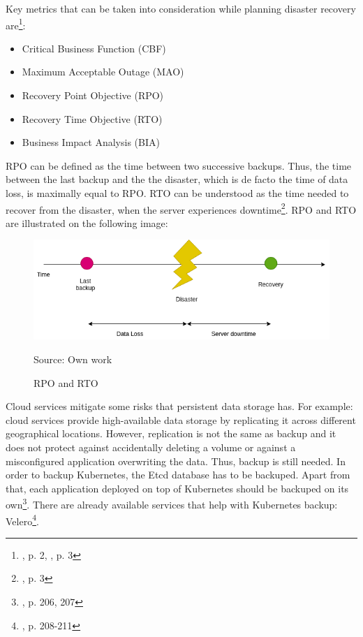 Key metrics that can be taken into consideration while planning disaster recovery are\footnote{\cite{article-dr}, p. 2, \cite{article-dr-cloud}, p. 3}:
\begin{itemize}
\item Critical Business Function (CBF)
\item Maximum Acceptable Outage (MAO)
\item Recovery Point Objective (RPO)
\item Recovery Time Objective (RTO)
\item Business Impact Analysis (BIA)
\end{itemize}
RPO can be defined as the time between two successive backups. Thus, the time between the last backup and the the disaster, which is de facto the time of data loss, is maximally equal to RPO. RTO can be understood as the time needed to recover from the disaster, when the server experiences downtime\footnote{\cite{article-dr-cloud}, p. 3}. RPO and RTO are illustrated on the following image:
\begin{figure}[H]
    \centering
    \includegraphics[width=13cm]{figures/rpo-rto.png}
    \label{fig:rpo-rto}
    \caption{RPO and RTO}
    \small{Source: Own work}
\end{figure}

Cloud services mitigate some risks that persistent data storage has. For example: cloud services provide high-available data storage by replicating it across different geographical locations. However, replication is not the same as backup and it does not protect against accidentally deleting a volume or against a misconfigured application overwriting the data. Thus, backup is still needed. In order to backup Kubernetes, the Etcd database has to be backuped. Apart from that, each application deployed on top of Kubernetes should be backuped on its own\footnote{\cite{book-cndwk}, p. 206, 207}. There are already available services that help with Kubernetes backup: Velero\footnote{\cite{book-cndwk}, p. 208-211}.

